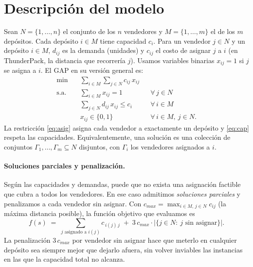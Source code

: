 \documentclass[11pt,a4paper]{article}
\begin{document}
\section{Descripción del modelo}
Sean $N=\{1,\dots,n\}$ el conjunto de los $n$ vendedores y $M=\{1,\dots,m\}$ el de los $m$
depósitos. Cada
depósito $i\in M$ tiene capacidad $c_i$. Para un vendedor $j\in N$ y un depósito $i\in M$,
$d_{ij}$ es la demanda (unidades) y $c_{ij}$ el costo de asignar $j$ a $i$ (en ThunderPack, la
distancia que recorrería $j$). Usamos variables binarias $x_{ij}=1$ si $j$ se asigna a $i$.
El GAP en su versión general es:
\begin{align}
  \min \quad & \sum_{i\in M}\sum_{j\in N} c_{ij}\,x_{ij} \label{eq:obj}\\
  \text{s.a.}\quad & \sum_{i\in M} x_{ij} = 1 && \forall\, j\in N \label{eq:asig}\\
  & \sum_{j\in N} d_{ij}\,x_{ij} \le c_i && \forall\, i\in M \label{eq:cap}\\
  & x_{ij}\in\{0,1\} && \forall\, i\in M,\ j\in N. \nonumber
\end{align}
La restricción \eqref{eq:asig} asigna cada vendedor a exactamente un depósito y \eqref{eq:cap}
respeta las capacidades. Equivalentemente, una solución es una colección de conjuntos
$\Gamma_1,\dots,\Gamma_m\subseteq N$ disjuntos, con $\Gamma_i$ los vendedores asignados a $i$.

\paragraph{Soluciones parciales y penalización.} Según las capacidades y demandas, puede que no
exista una asignación factible que cubra a todos los vendedores. En ese caso admitimos
\emph{soluciones parciales} y penalizamos a cada vendedor sin asignar. Con
$c_{max}=\max_{i\in M,\,j\in N} c_{ij}$ (la máxima distancia posible), la función objetivo que
evaluamos es
\begin{equation}
  f(s)\;=\;\sum_{j \text{ asignado a } i(j)} c_{\,i(j)\,j}\;+\;3\,c_{max}\cdot\bigl|\{j\in N:\ j\text{ sin asignar}\}\bigr|.
  \label{eq:penal}
\end{equation}
La penalización $3\,c_{max}$ por vendedor sin asignar hace que meterlo en cualquier depósito sea
siempre mejor que dejarlo afuera, sin volver inviables las instancias en las que la capacidad
total no alcanza.
\end{document}
